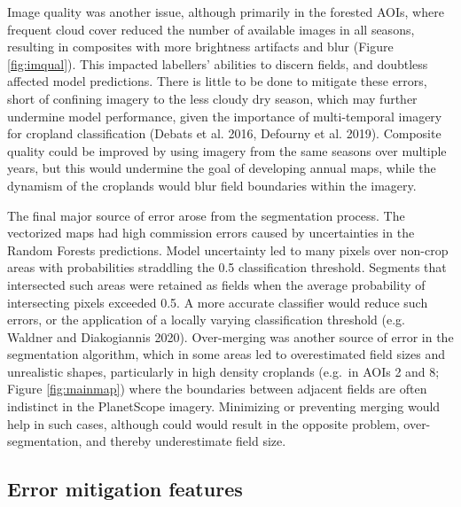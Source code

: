 \documentclass[11pt,a4paper]{article}
\begin{document}
Image quality was another issue, although primarily in the forested
AOIs, where frequent cloud cover reduced the number of available images
in all seasons, resulting in composites with more brightness artifacts
and blur (Figure \ref{fig:imqual}). This impacted labellers' abilities
to discern fields, and doubtless affected model predictions. There is
little to be done to mitigate these errors, short of confining imagery
to the less cloudy dry season, which may further undermine model
performance, given the importance of multi-temporal imagery for cropland
classification (Debats et al. 2016, Defourny et al. 2019). Composite
quality could be improved by using imagery from the same seasons over
multiple years, but this would undermine the goal of developing annual
maps, while the dynamism of the croplands would blur field boundaries
within the imagery.

The final major source of error arose from the segmentation process. The
vectorized maps had high commission errors caused by uncertainties in
the Random Forests predictions. Model uncertainty led to many pixels
over non-crop areas with probabilities straddling the 0.5 classification
threshold. Segments that intersected such areas were retained as fields
when the average probability of intersecting pixels exceeded 0.5. A more
accurate classifier would reduce such errors, or the application of a
locally varying classification threshold (e.g. Waldner and Diakogiannis
2020). Over-merging was another source of error in the segmentation
algorithm, which in some areas led to overestimated field sizes and
unrealistic shapes, particularly in high density croplands (e.g.~in AOIs
2 and 8; Figure \ref{fig:mainmap}) where the boundaries between adjacent
fields are often indistinct in the PlanetScope imagery. Minimizing or
preventing merging would help in such cases, although could would result
in the opposite problem, over-segmentation, and thereby underestimate
field size.

\hypertarget{error-mitigation-features}{%
\subsection{Error mitigation features}\label{error-mitigation-features}}
\end{document}
